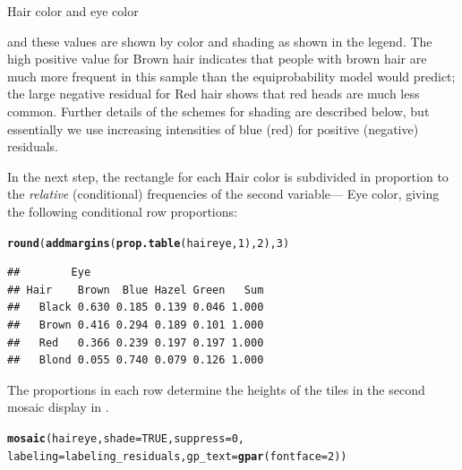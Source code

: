 \documentclass[11pt]{book}\usepackage[]{graphicx}\usepackage[]{color}
\makeatletter
\newcommand{\hlnum}[1]{\textcolor[rgb]{0.686,0.059,0.569}{#1}}%
\newcommand{\hlstd}[1]{\textcolor[rgb]{0.345,0.345,0.345}{#1}}%
\newcommand{\hlkwc}[1]{\textcolor[rgb]{0.333,0.667,0.333}{#1}}%
\newcommand{\hlkwd}[1]{\textcolor[rgb]{0.737,0.353,0.396}{\textbf{#1}}}%
\newenvironment{kframe}{%
 \def\at@end@of@kframe{}%
 \ifinner\ifhmode%
  \def\at@end@of@kframe{\end{minipage}}%
  \begin{minipage}{\columnwidth}%
 \fi\fi%
 \def\FrameCommand##1{\hskip\@totalleftmargin \hskip-\fboxsep
 \colorbox{shadecolor}{##1}\hskip-\fboxsep
     \hskip-\linewidth \hskip-\@totalleftmargin \hskip\columnwidth}%
 \MakeFramed {\advance\hsize-\width
   \@totalleftmargin\z@ \linewidth\hsize
   \@setminipage}}%
 {\par\unskip\endMakeFramed%
 \at@end@of@kframe}
\newenvironment{knitrout}{}{} %
\renewenvironment{knitrout}{\small\renewcommand{\baselinestretch}{.85}}{} %
\makeatother
\begin{document}
\begin{Example}[haireye2a]{Hair color and eye color}
\begin{itemize}
and these values are shown by color and shading as shown in the legend.
The high positive value for Brown hair indicates that people
with brown hair are much more frequent in this sample than 
the equiprobability model would predict; the large negative residual
for Red hair shows that red heads are much less common.  Further details
of the schemes for shading are described below, but essentially we use
increasing intensities of blue (red) for positive (negative) residuals.
\end{itemize}

In the next step, the rectangle for each Hair color is subdivided in proportion
to the \emph{relative} (conditional) frequencies of the second variable---
Eye color, giving the following conditional row proportions:

\begin{knitrout}
\color{fgcolor}\begin{kframe}
\begin{alltt}
\hlkwd{round}\hlstd{(}\hlkwd{addmargins}\hlstd{(}\hlkwd{prop.table}\hlstd{(haireye,} \hlnum{1}\hlstd{),} \hlnum{2}\hlstd{),} \hlnum{3}\hlstd{)}
\end{alltt}
\begin{verbatim}
##        Eye
## Hair    Brown  Blue Hazel Green   Sum
##   Black 0.630 0.185 0.139 0.046 1.000
##   Brown 0.416 0.294 0.189 0.101 1.000
##   Red   0.366 0.239 0.197 0.197 1.000
##   Blond 0.055 0.740 0.079 0.126 1.000
\end{verbatim}
\end{kframe}
\end{knitrout}

The proportions in each row determine the heights of the tiles in the second mosaic display in .

\begin{knitrout}
\color{fgcolor}\begin{kframe}
\begin{alltt}
 \hlkwd{mosaic}\hlstd{(haireye,} \hlkwc{shade}\hlstd{=}\hlnum{TRUE}\hlstd{,} \hlkwc{suppress}\hlstd{=}\hlnum{0}\hlstd{,}
        \hlkwc{labeling}\hlstd{=labeling_residuals,} \hlkwc{gp_text}\hlstd{=}\hlkwd{gpar}\hlstd{(}\hlkwc{fontface}\hlstd{=}\hlnum{2}\hlstd{))}
\end{alltt}
\end{kframe}\begin{figure}[htbp]



\end{figure}
\end{knitrout}
\end{Example}
\end{document}
